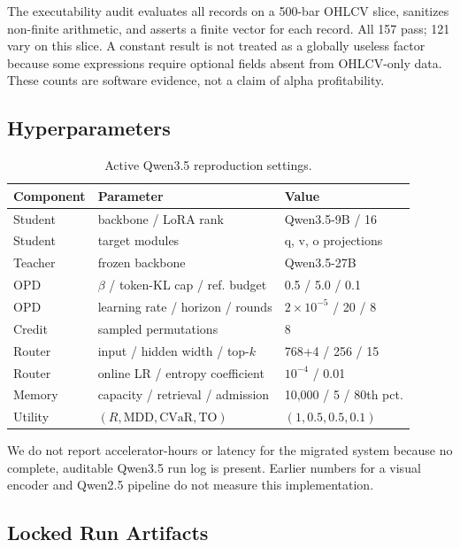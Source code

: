 The executability audit evaluates all records on a 500-bar OHLCV slice, sanitizes non-finite arithmetic, and asserts a finite vector for each record. All 157 pass; 121 vary on this slice. A constant result is not treated as a globally useless factor because some expressions require optional fields absent from OHLCV-only data. These counts are software evidence, not a claim of alpha profitability.

\subsection{Hyperparameters}

\begin{table}[h]
\centering
\small
\caption{Active Qwen3.5 reproduction settings.}
\label{tab:hyperparams}
\setlength{\tabcolsep}{4pt}
\begin{tabular}{lll}
\toprule
Component & Parameter & Value \\
\midrule
Student & backbone / LoRA rank & Qwen3.5-9B / 16 \\
Student & target modules & q, v, o projections \\
Teacher & frozen backbone & Qwen3.5-27B \\
OPD & $\beta$ / token-KL cap / ref. budget & 0.5 / 5.0 / 0.1 \\
OPD & learning rate / horizon / rounds & $2\times10^{-5}$ / 20 / 8 \\
Credit & sampled permutations & 8 \\
Router & input / hidden width / top-$k$ & 768+4 / 256 / 15 \\
Router & online LR / entropy coefficient & $10^{-4}$ / 0.01 \\
Memory & capacity / retrieval / admission & 10,000 / 5 / 80th pct. \\
Utility & $(R,\mathrm{MDD},\mathrm{CVaR},\mathrm{TO})$ & $(1,0.5,0.5,0.1)$ \\
\bottomrule
\end{tabular}
\end{table}

We do not report accelerator-hours or latency for the migrated system because no complete, auditable Qwen3.5 run log is present. Earlier numbers for a visual encoder and Qwen2.5 pipeline do not measure this implementation.

\subsection{Locked Run Artifacts}

